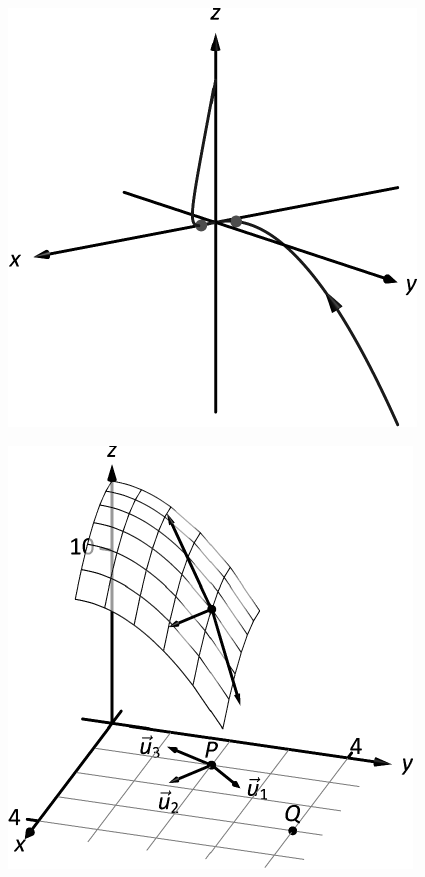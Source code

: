 \documentclass[10pt]{article}
\begin{document}
\includegraphics{figcurvature4_3DBW.pdf}
\texttt{}

\includegraphics{figdirect1_3DBW.pdf}
\texttt{}
\end{document}
